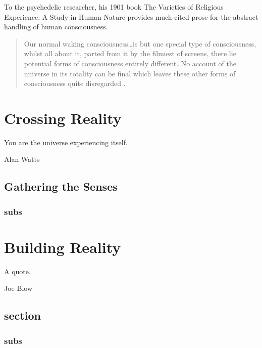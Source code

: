 \documentclass{UIdahoMastersThesis}
\begin{document}
To the psychedelic researcher, his 1901 book The Varieties of Religious Experience: A Study in Human Nature provides much-cited prose for the abstract handling of human consciousness.

\begin{quote}
{Our normal waking consciousness\ldots is but one special type of consciousness, whilst all about it, parted from it by the filmiest of screens, there lie potential forms of consciousness entirely different\ldots No account of the universe in its totality can be final which leaves these other forms of consciousness quite disregarded \cite{james1961varieties}.}
\end{quote}


\chapter{Crossing Reality}
\label{Chapter:CrossingReality}
\epigraph {You are the universe experiencing itself.}{Alan Watts}

\vspace{9mm}

\section{Gathering the Senses}

\subsection{subs}

\chapter{Building Reality}
\label{Chapter:BuildingReality}
\epigraph {A quote.}{Joe Blow}

\vspace{9mm}


\section{section}

\subsection{subs}
\end{document}
